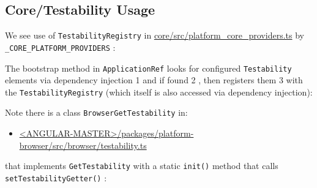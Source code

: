 \subsection{Core/Testability Usage}

We see use of
\texttt{TestabilityRegistry}
in
\url{core/src/platform_core_providers.ts}
by
\texttt{\_CORE\_PLATFORM\_PROVIDERS}
:



The bootstrap method in
\texttt{ApplicationRef}
looks for configured
\texttt{Testability}
elements
via dependency injection
1
and if found
2
, then registers them
3
with the
\texttt{TestabilityRegistry}
(which itself is also accessed via dependency injection):



Note there is a class
\texttt{BrowserGetTestability}
in:

\begin{itemize}
  \item \href{https://github.com/angular/angular/blob/master/packages/platform-browser/src/browser/testability.ts}
        {<ANGULAR-MASTER>/packages/platform-browser/src/browser/testability.ts}
\end{itemize}

that implements
\texttt{GetTestability}
with a static
\texttt{init()}
method that calls
\texttt{setTestabilityGetter()}
:


